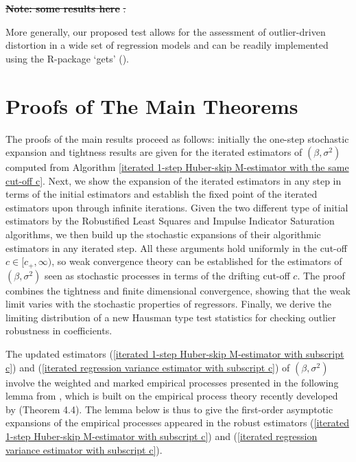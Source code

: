 \documentclass[11pt, letterpaper]{article}
\numberwithin{algorithm}{section}
\numberwithin{assumption}{section}
\numberwithin{lemma}{section}
\numberwithin{theorem}{section}
\numberwithin{corollary}{section}
\numberwithin{remark}{section}
\numberwithin{equation}{section}
\numberwithin{figure}{section}
\numberwithin{table}{section}
\newcommand{\ignore}[1]{} %
\providecommand{\DIFadd}[1]{{\protect\color{blue}\uwave{#1}}} %
\providecommand{\DIFdel}[1]{{\protect\color{red}\sout{#1}}}                      %
\providecommand{\DIFaddbegin}{} %
\providecommand{\DIFaddend}{} %
\providecommand{\DIFdelbegin}{} %
\providecommand{\DIFdelend}{} %
\newcommand{\DIFscaledelfig}{0.5}
\newlength{\DIFdelgraphicswidth} %
\newlength{\DIFdelgraphicsheight} %
\newcommand{\DIFaddincludegraphics}[2][]{{\color{blue}\fbox{\DIFOincludegraphics[#1]{#2}}}} %
\newcommand{\DIFdelincludegraphics}[2][]{%
\sbox{\DIFdelgraphicsbox}{\DIFOincludegraphics[#1]{#2}}%
\settoboxwidth{\DIFdelgraphicswidth}{\DIFdelgraphicsbox} %
\settoboxtotalheight{\DIFdelgraphicsheight}{\DIFdelgraphicsbox} %
\scalebox{\DIFscaledelfig}{%
\parbox[b]{\DIFdelgraphicswidth}{\usebox{\DIFdelgraphicsbox}\\[-\baselineskip] \rule{\DIFdelgraphicswidth}{0em}}\llap{\resizebox{\DIFdelgraphicswidth}{\DIFdelgraphicsheight}{%
\setlength{\unitlength}{\DIFdelgraphicswidth}%
\begin{picture}(1,1)%
\thicklines\linethickness{2pt} %
{\color[rgb]{1,0,0}\put(0,0){\framebox(1,1){}}}%
{\color[rgb]{1,0,0}\put(0,0){\line( 1,1){1}}}%
{\color[rgb]{1,0,0}\put(0,1){\line(1,-1){1}}}%
\end{picture}%
}\hspace*{3pt}}} %
} %
\DeclareRobustCommand{\DIFaddbegin}{\DIFOaddbegin \let\includegraphics\DIFaddincludegraphics} %
\DeclareRobustCommand{\DIFaddend}{\DIFOaddend \let\includegraphics\DIFOincludegraphics} %
\DeclareRobustCommand{\DIFdelbegin}{\DIFOdelbegin \let\includegraphics\DIFdelincludegraphics} %
\DeclareRobustCommand{\DIFdelend}{\DIFOaddend \let\includegraphics\DIFOincludegraphics} %
\begin{document}
\DIFdelbegin \textbf{%
\DIFdel{Note: some results here}%
}%
\DIFdel{.
}\DIFdelend \DIFaddbegin \DIFadd{\ignore{More results}
}\DIFaddend

More generally, our proposed test allows for the assessment of outlier-driven distortion in a wide set of regression models and can be readily implemented using the R-package `gets' (\citealt{pretis2018automated}).

\newpage
\linespread{1} \selectfont




\newpage
\appendix
\section{Proofs of The Main Theorems} \label{sec_proofs}
The proofs of the main results proceed as follows: initially the one-step stochastic expansion and tightness results are given for the iterated estimators of $(\beta, \sigma^{2})$ computed from Algorithm \ref{iterated 1-step Huber-skip M-estimator with the same cut-off c}. Next, we show the expansion of the iterated estimators in any step in terms of the initial estimators and establish the fixed point of the iterated estimators upon through infinite iterations. Given the two different type of initial estimators by the Robustified Least Squares and Impulse Indicator Saturation algorithms, we then build up the stochastic expansions of their algorithmic estimators in any iterated step. All these arguments hold uniformly in the cut-off $c \in [c_{+}, \infty)$, so weak convergence theory can be established for the estimators of $(\beta, \sigma^{2})$ seen as stochastic processes in terms of the drifting cut-off $c$. The proof combines the tightness and finite dimensional convergence, showing that the weak limit varies with the stochastic properties of regressors. Finally, we derive the limiting distribution of a new Hausman type test statistics for checking outlier robustness in coefficients.

The updated estimators (\ref{iterated 1-step Huber-skip M-estimator with subscript c}) and (\ref{iterated regression variance estimator with subscript c}) of $(\beta, \sigma^{2})$ involve the weighted and marked empirical processes presented in the following lemma from \cite{jiao2020testingoutlier}, which is built on the empirical process theory recently developed by \cite{berenguer2019analysis} (Theorem 4.4). The lemma below is thus to give the first-order asymptotic expansions of the empirical processes appeared in the robust estimators (\ref{iterated 1-step Huber-skip M-estimator with subscript c}) and (\ref{iterated regression variance estimator with subscript c}).
\end{document}
